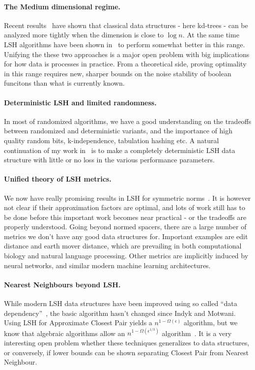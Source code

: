 \documentclass[10pt]{article}
\begin{document}
\paragraph{The Medium dimensional regime.} Recent results~\cite{DBLP:conf/compgeom/Chan17a} have shown that classical data structures - here kd-trees - can be analyzed more tightly when the dimension is close to $\log n$.
At the same time LSH algorithms have been shown in~\cite{becker2016new} to perform somewhat better in this range.
Unifying the these two approaches is a major open problem with big implications for how data is processes in practice.
From a theoretical side, proving optimality in this range requires new, sharper bounds on the noise stability of boolean funcitons than what is currently known.

\paragraph{Deterministic LSH and limited randomness.} In most of randomized algorithms, we have a good understanding on the tradeoffs between randomized and deterministic variants, and the importance of high quality random bits, k-independence, tabulation hashing etc.
A natural continuation of my work in~\cite{ahle2017optimal} is to make a completely deterministic LSH data structure with little or no loss in the various performance parameters.

\paragraph{Unified theory of LSH metrics.}
We now have really promising results in LSH for symmetric norms~\cite{DBLP:journals/siamcomp/AndoniKR18}.
It is however not clear if their approximation factors are optimal, and lots of work still has to be done before this important work becomes near practical - or the tradeoffs are properly understood.
Going beyond normed spacers, there are a large number of metrics we don’t have any good data structures for.
Important examples are edit distance and earth mover distance, which are prevailing in both computational biology and natural language processing.
Other metrics are implicitly induced by neural networks, and similar modern machine learning architectures.

\paragraph{Nearest Neighbours beyond LSH.}
While modern LSH data structures have been improved using so called ``data dependency''~\cite{DBLP:journals/corr/AndoniR15, DBLP:conf/stoc/AndoniNNRW18}, the basic algorithm hasn’t changed since Indyk and Motwani.
Using LSH for Approximate Closest Pair yields a $n^{1-\Omega(\epsilon)}$ algorithm, but we know that algebraic algorithms allow an $n^{1-\Omega(\epsilon^{1/3})}$ algorithm~\cite{DBLP:journals/corr/AlmanCW16}.
It is a very interesting open problem whether these techniques generalizes to data structures, or conversely, if lower bounds can be shown separating Closest Pair from Nearest Neighbour.
\end{document}
